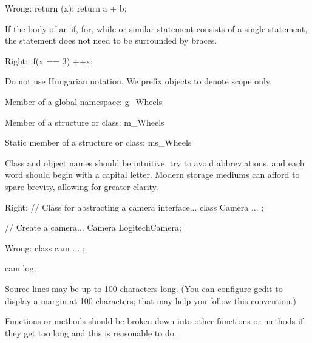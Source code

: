 Wrong:
\startCodeExample
\starttyping
return (x);
return a + b;
\stoptyping
\stopCodeExample

\item
If the body of an if, for, while or similar statement consists of a single statement, the statement does not need to be surrounded by braces.


Right:
\startCodeExample
\starttyping
if(x == 3)
  ++x;
\stoptyping
\stopCodeExample

\stopitemize



\startitemize[3]
\setupwhitespace[big]
\item
Do not use Hungarian notation. We prefix objects to denote scope only.


Member of a global namespace:
\startCodeExample
\starttyping
g_Wheels
\stoptyping
\stopCodeExample

Member of a structure or class:
\startCodeExample
\starttyping
m_Wheels
\stoptyping
\stopCodeExample

Static member of a structure or class:
\startCodeExample
\starttyping
ms_Wheels
\stoptyping
\stopCodeExample

\item
Class and object names should be intuitive, try to avoid abbreviations, and each word should begin with a capital letter. Modern storage mediums can afford to spare brevity, allowing for greater clarity.


Right:
\startCodeExample
\starttyping
// Class for abstracting a camera interface...
class Camera
{
    ...
};

// Create a camera...
Camera LogitechCamera;
\stoptyping
\stopCodeExample

Wrong:
\startCodeExample
\starttyping
class cam
{
    ...
};

cam log;
\stoptyping
\stopCodeExample

\stopitemize


\startitemize[3]
\setupwhitespace[big]
\item
Source lines may be up to 100 characters long. (You can configure gedit to display a margin at 100 characters; that may help you follow this convention.)

\item
Functions or methods should be broken down into other functions or methods if they get too long and this is reasonable to do.

